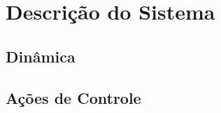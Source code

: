 \section{Descrição do Sistema}
\lipsum[1]

\subsection{Dinâmica}
\lipsum[1]

\subsection{Ações de Controle}
\lipsum[1]